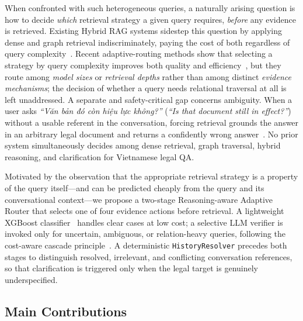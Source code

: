 ﻿\documentclass[11pt,twocolumn]{article}
\begin{document}
When confronted with such heterogeneous queries, a naturally arising
question is how to decide \emph{which} retrieval strategy a given query
requires, \emph{before} any evidence is retrieved. Existing Hybrid RAG
systems sidestep this question by applying dense and graph retrieval
indiscriminately, paying the cost of both regardless of query
complexity~\cite{edge2024graphrag,he2024lightrag,gao2023modularrag}.
Recent adaptive-routing methods show that selecting a strategy by query
complexity improves both quality and
efficiency~\cite{jeong2024adaptive,chen2023frugalgpt,ong2024routellm}, but
they route among \emph{model sizes} or \emph{retrieval depths} rather than
among distinct \emph{evidence mechanisms}; the decision of whether a query
needs relational traversal at all is left unaddressed. A separate and
safety-critical gap concerns ambiguity. When a user asks
\textit{``Văn bản đó còn hiệu lực không?''} (\textit{``Is that document
still in effect?''}) without a usable referent in the conversation,
forcing retrieval grounds the answer in an arbitrary legal document and
returns a confidently wrong answer~\cite{min2020ambigqa,elgohary2019canard}.
No prior system simultaneously decides among dense retrieval, graph
traversal, hybrid reasoning, and clarification for Vietnamese legal QA.

Motivated by the observation that the appropriate retrieval strategy is a
property of the query itself---and can be predicted cheaply from the query
and its conversational context---we propose a two-stage Reasoning-aware
Adaptive Router that selects one of four evidence actions before
retrieval. A lightweight XGBoost classifier~\cite{chen2016xgboost} handles
clear cases at low cost; a selective LLM verifier is invoked only for
uncertain, ambiguous, or relation-heavy queries, following the cost-aware
cascade principle~\cite{chen2023frugalgpt,ong2024routellm}. A
deterministic \texttt{HistoryResolver} precedes both stages to distinguish
resolved, irrelevant, and conflicting conversation references, so that
clarification is triggered only when the legal target is genuinely
underspecified.

\subsection{Main Contributions}
\end{document}
